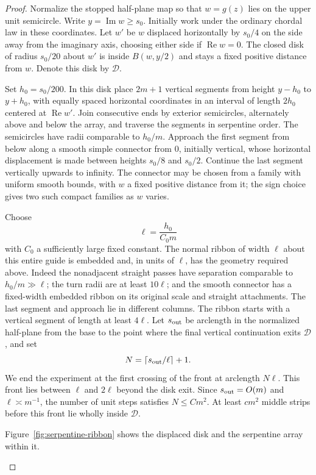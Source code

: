 \documentclass[11pt]{article}
\theoremstyle{definition}
\theoremstyle{remark}
\numberwithin{equation}{section}
\begin{document}
\begin{proof}
Normalize the stopped half-plane map so that $w=g(z)$ lies on the upper
unit semicircle.  Write $y=\operatorname{Im}w\ge s_0$.  Initially work
under the ordinary chordal law in these coordinates.  Let $w'$ be
$w$ displaced horizontally by $s_0/4$ on the side away from the imaginary
axis, choosing either side if $\operatorname{Re}w=0$.  The closed disk
of radius $s_0/20$ about $w'$ is inside $B(w,y/2)$ and stays a fixed
positive distance from $w$. Denote this disk by $\mathcal D$.

Set $h_0=s_0/200$.  In this disk place $2m+1$ vertical segments from
height $y-h_0$ to $y+h_0$, with equally spaced horizontal coordinates
in an interval of length $2h_0$ centered at $\operatorname{Re}w'$.
Join consecutive ends by exterior semicircles, alternately above and
below the array, and traverse the segments in serpentine order.  The
semicircles have radii comparable to $h_0/m$.  Approach the first segment
from below along a smooth simple connector from $0$, initially vertical,
whose horizontal displacement is made between heights $s_0/8$ and
$s_0/2$.  Continue the last segment vertically upwards to infinity.
The connector may be chosen from a family with uniform smooth bounds,
with $w$ a fixed positive distance from it; the sign choice gives two
such compact families as $w$ varies.

Choose
\[
 \ell=\frac{h_0}{C_0m}
\]
with $C_0$ a sufficiently large fixed constant.  The normal ribbon of
width $\ell$ about this entire guide is embedded and, in units of
$\ell$, has the geometry required above.  Indeed the nonadjacent
straight passes have separation comparable to $h_0/m\gg\ell$;
the turn radii are at least $10\ell$; and the smooth connector has a
fixed-width embedded ribbon on its original scale and straight
attachments.  The last segment and approach lie in different columns.
The ribbon starts with a vertical segment of length at least $4\ell$.
Let $s_{\rm out}$ be arclength in the normalized half-plane from the
base to the point where the final vertical continuation exits $\mathcal D$,
and set
\[
 N=\left\lceil s_{\rm out}/\ell\right\rceil+1.
\]
We end the experiment at the first crossing of the front at arclength
$N\ell$. This front lies between $\ell$ and $2\ell$ beyond the disk
exit. Since $s_{\rm out}=O(m)$ and $\ell\asymp m^{-1}$, the number of
unit steps satisfies $N\le Cm^2$. At least $cm^2$ middle strips before
this front lie wholly inside $\mathcal D$.

Figure~\ref{fig:serpentine-ribbon} shows the displaced disk and the
serpentine array within it.
\begin{figure}[!htbp]
\centering
\begingroup
{}
\end{figure}
\end{proof}
\end{document}

